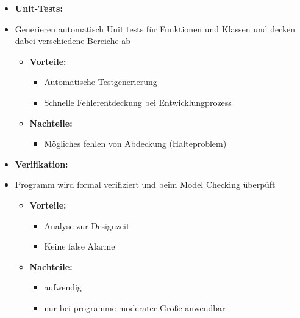 \documentclass[a4paper,12pt]{article}
\begin{document}
\begin{itemize}
    \item \textbf{Unit-Tests:}
    \item Generieren automatisch Unit tests für Funktionen und Klassen und decken dabei verschiedene Bereiche ab
    \begin{itemize}
        \item \textbf{Vorteile:}
        \begin{itemize}
            \item Automatische Testgenerierung
            \item Schnelle Fehlerentdeckung bei Entwicklungprozess
        \end{itemize}
        \item \textbf{Nachteile:}
        \begin{itemize}
            \item Mögliches fehlen von Abdeckung (Halteproblem)
        \end{itemize}
    \end{itemize}
    \item \textbf{Verifikation:}
    \item Programm wird formal verifiziert und beim Model Checking überpüft
    \begin{itemize}
        \item \textbf{Vorteile:}
        \begin{itemize}
            \item Analyse zur Designzeit
            \item Keine false Alarme
        \end{itemize}
        \item \textbf{Nachteile:}
        \begin{itemize}
            \item aufwendig
            \item nur bei programme moderater Größe anwendbar
        \end{itemize}
    \end{itemize} 
    

\end{itemize}
\end{document}
